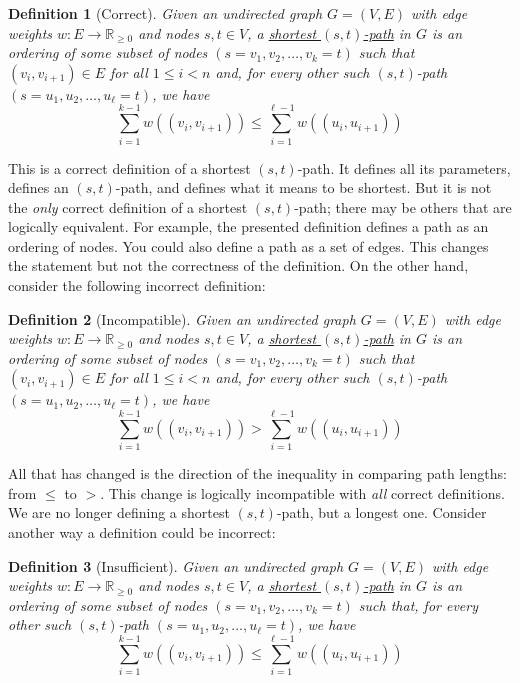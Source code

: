 \documentclass[10pt]{article}
\newtheorem*{definition}{Definition}
\begin{document}
\begin{definition}[Correct]
    Given an undirected graph $G = (V, E)$ with edge weights $w : E \to \mathbb{R}_{\geq 0}$ and nodes $s, t \in V$, a \underline{shortest $(s,t)$-path} in $G$ is an ordering of some subset of nodes $(s = v_1, v_2, \ldots, v_k = t)$ such that $(v_i, v_{i+1}) \in E$ for all $1 \leq i < n$ and, for every other such $(s,t)$-path $(s = u_1, u_2, \ldots, u_\ell = t)$, we have
    \[\sum_{i=1}^{k-1} w((v_i, v_{i+1})) \leq \sum_{i=1}^{\ell - 1} w((u_i, u_{i+1}))\]
\end{definition}

This is a correct definition of a shortest $(s,t)$-path.
It defines all its parameters, defines an $(s,t)$-path, and defines what it means to be shortest.
But it is not the \textit{only} correct definition of a shortest $(s,t)$-path; there may be others that are logically equivalent.
For example, the presented definition defines a path as an ordering of nodes.
You could also define a path as a set of edges.
This changes the statement but not the correctness of the definition.
On the other hand, consider the following incorrect definition:

\begin{definition}[Incompatible]
    Given an undirected graph $G = (V, E)$ with edge weights $w : E \to \mathbb{R}_{\geq 0}$ and nodes $s, t \in V$, a \underline{shortest $(s,t)$-path} in $G$ is an ordering of some subset of nodes $(s = v_1, v_2, \ldots, v_k = t)$ such that $(v_i, v_{i+1}) \in E$ for all $1 \leq i < n$ and, for every other such $(s,t)$-path $(s = u_1, u_2, \ldots, u_\ell = t)$, we have
    \[\sum_{i=1}^{k-1} w((v_i, v_{i+1})) > \sum_{i=1}^{\ell - 1} w((u_i, u_{i+1}))\]
\end{definition}

All that has changed is the direction of the inequality in comparing path lengths: from $\leq$ to $>$.
This change is logically incompatible with \textit{all} correct definitions.
We are no longer defining a shortest $(s,t)$-path, but a longest one.
Consider another way a definition could be incorrect:

\begin{definition}[Insufficient]
    Given an undirected graph $G = (V, E)$ with edge weights $w : E \to \mathbb{R}_{\geq 0}$ and nodes $s, t \in V$, a \underline{shortest $(s,t)$-path} in $G$ is an ordering of some subset of nodes $(s = v_1, v_2, \ldots, v_k = t)$ such that, for every other such $(s,t)$-path $(s = u_1, u_2, \ldots, u_\ell = t)$, we have
    \[\sum_{i=1}^{k-1} w((v_i, v_{i+1})) \leq \sum_{i=1}^{\ell - 1} w((u_i, u_{i+1}))\]
\end{definition}
\end{document}
